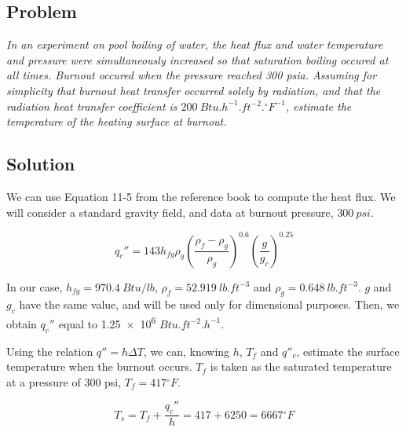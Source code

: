 \subsection{Problem}
\textit{In an experiment on pool boiling of water, the heat flux and water temperature and pressure were simultaneously increased so that saturation boiling occured at all times. Burnout occured when the pressure reached 300 psia. Assuming for simplicity that burnout heat transfer occurred solely by radiation, and that the radiation heat transfer coefficient is $200\ Btu.h^{-1}.ft^{-2}.{}^\circ F^{-1}$, estimate the temperature of the heating surface at burnout.} 

\subsection{Solution}


We can use Equation 11-5 from the reference book to compute the heat flux. We will consider a standard gravity field, and data at burnout pressure, $300\ psi$.

\begin{equation}
q_c'' = 143 h_{fg} \rho_g \left( \frac{\rho_f - \rho_g}{\rho_g} \right)^{0.6} \left( \frac{g}{g_c} \right)^{0.25}
\end{equation}

In our case, $h_{fg} = 970.4\ Btu/lb$, $\rho_f = 52.919\ lb.ft^{-3}$ and $\rho_g = 0.648\ lb.ft^{-3}$. $g$ and $g_c$ have the same value, and will be used only for dimensional purposes. Then, we obtain $q_c''$ equal to \num{1.25e6} $Btu.ft^{-2}.h^{-1}$.

Using the relation $q'' = h\Delta T$, we can, knowing $h$, $T_f$ and $q''_c$, estimate the surface temperature when the burnout occurs. $T_f$ is taken as the saturated temperature at a pressure of 300 psi, $T_f = 417{}^\circ F$.

\begin{equation}
T_s = T_f + \frac{q_c''}{h} = 417 + 6250 = 6667{}^\circ F
\end{equation}

